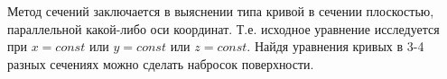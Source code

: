 \begin{remark}
  Метод сечений заключается в выяснении типа кривой в сечении плоскостью,
  параллельной какой-либо оси координат. Т.е. исходное уравнение исследуется при
  \(x = const\) или \(y = const\) или \(z = const\). Найдя уравнения кривых в
  3-4 разных сечениях можно сделать набросок поверхности.
\end{remark}
